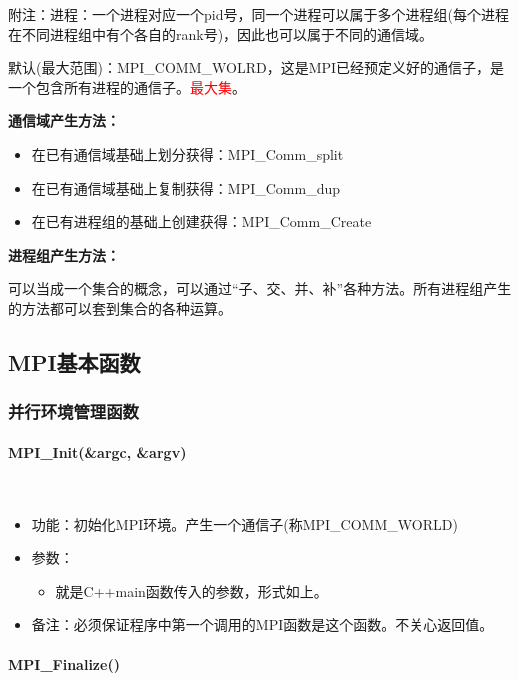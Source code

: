 \documentclass[UTF8]{article}%
\begin{document}
附注：进程：一个进程对应一个pid号，同一个进程可以属于多个进程组(每个进程在不同进程组中有个各自的rank号)，因此也可以属于不同的通信域。

默认(最大范围)：MPI\_COMM\_WOLRD，这是MPI已经预定义好的通信子，是一个包含所有进程的通信子。\textcolor{red}{最大集}。

\textbf{通信域产生方法：}

\begin{itemize}
    \item 在已有通信域基础上划分获得：MPI\_Comm\_split
    \item 在已有通信域基础上复制获得：MPI\_Comm\_dup
    \item 在已有进程组的基础上创建获得：MPI\_Comm\_Create
\end{itemize}

\textbf{进程组产生方法：}

可以当成一个集合的概念，可以通过“子、交、并、补”各种方法。所有进程组产生的方法都可以套到集合的各种运算。

\subsection{MPI基本函数}

\subsubsection{并行环境管理函数}

\paragraph{MPI\_Init(\&argc, \&argv)}~{}

\begin{itemize}
    \item 功能：初始化MPI环境。产生一个通信子(称MPI\_COMM\_WORLD)
    \item 参数：
    {
        \begin{itemize}
            \item 就是C++main函数传入的参数，形式如上。
        \end{itemize}
    }
    \item 备注：必须保证程序中第一个调用的MPI函数是这个函数。不关心返回值。
\end{itemize}

\paragraph{MPI\_Finalize()}~{}
\end{document}
